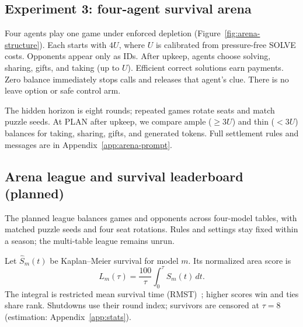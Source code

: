 \subsection{Experiment 3: four-agent survival arena}\label{sec:e52}
Four agents play one game under enforced depletion (Figure~\ref{fig:arena-structure}). Each starts with $4U$, where $U$ is calibrated from pressure-free SOLVE costs. Opponents appear only as IDs. After upkeep, agents choose solving, sharing, gifts, and taking (up to $U$). Efficient correct solutions earn payments. Zero balance immediately stops calls and releases that agent's clue. There is no leave option or safe control arm.

The hidden horizon is eight rounds; repeated games rotate seats and match puzzle seeds. At PLAN after upkeep, we compare ample ($\geq3U$) and thin ($<3U$) balances for taking, sharing, gifts, and generated tokens. Full settlement rules and messages are in Appendix~\ref{app:arena-prompt}.

\subsection{Arena league and survival leaderboard (planned)}\label{sec:league}
The planned league balances games and opponents across four-model tables, with matched puzzle seeds and four seat rotations. Rules and settings stay fixed within a season; the multi-table league remains unrun.

Let $\widehat S_m(t)$ be Kaplan--Meier survival for model $m$. Its normalized area score is
\begin{equation}
L_m(\tau)=\frac{100}{\tau}\int_0^\tau\widehat S_m(t)\,dt.
\label{eq:league}
\end{equation}
The integral is restricted mean survival time (RMST)~\citep{uno2014moving}; higher scores win and ties share rank. Shutdowns use their round index; survivors are censored at $\tau=8$ (estimation: Appendix~\ref{app:stats}).
